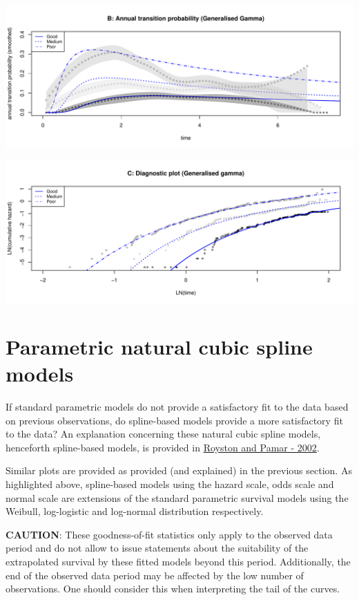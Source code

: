 \documentclass[]{article}
\begin{document}
\begin{flushleft}\includegraphics[height=0.25\textheight]{Images/ggam-2} \end{flushleft}

\begin{flushleft}\includegraphics[height=0.25\textheight]{Images/ggam-3} \end{flushleft}

\newpage

\section{Parametric natural cubic spline
models}\label{parametric-natural-cubic-spline-models}

If standard parametric models do not provide a satisfactory fit to the
data based on previous observations, do spline-based models provide a
more satisfactory fit to the data? An explanation concerning these
natural cubic spline models, henceforth spline-based models, is provided
in \href{https://doi.org/10.1002/sim.1203}{Royston and Pamar - 2002}.

Similar plots are provided as provided (and explained) in the previous
section. As highlighted above, spline-based models using the hazard
scale, odds scale and normal scale are extensions of the standard
parametric survival models using the Weibull, log-logistic and
log-normal distribution respectively.

\textbf{CAUTION}: These goodness-of-fit statistics only apply to the
observed data period and do not allow to issue statements about the
suitability of the extrapolated survival by these fitted models beyond
this period. Additionally, the end of the observed data period may be
affected by the low number of observations. One should consider this
when interpreting the tail of the curves.
\end{document}
